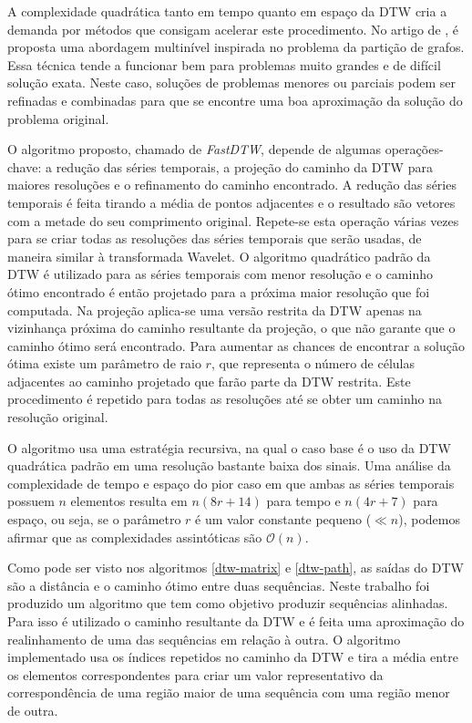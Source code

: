 A complexidade quadrática tanto em tempo quanto em espaço da DTW cria a demanda por métodos que consigam acelerar este procedimento. No artigo de \citet{salvador2007toward}, é proposta uma abordagem multinível inspirada no problema da partição de grafos. Essa técnica tende a funcionar bem para problemas muito grandes e de difícil solução exata. Neste caso, soluções de problemas menores ou parciais podem ser refinadas e combinadas para que se encontre uma boa aproximação da solução do problema original.

O algoritmo proposto, chamado de \textit{FastDTW}, depende de algumas operações-chave: a redução das séries temporais, a projeção do caminho da DTW para maiores resoluções e o refinamento do caminho encontrado. A redução das séries temporais é feita tirando a média de pontos adjacentes e o resultado são vetores com a metade do seu comprimento original. Repete-se esta operação várias vezes para se criar todas as resoluções das séries temporais que serão usadas, de maneira similar à transformada Wavelet. O algoritmo quadrático padrão da DTW é utilizado para as séries temporais com menor resolução e o caminho ótimo encontrado é então projetado para a próxima maior resolução que foi computada. Na projeção aplica-se uma versão restrita da DTW apenas na vizinhança próxima do caminho resultante da projeção, o que não garante que o caminho ótimo será encontrado. Para aumentar as chances de encontrar a solução ótima existe um parâmetro de raio $r$, que representa o número de células adjacentes ao caminho projetado que farão parte da DTW restrita. Este procedimento é repetido para todas as resoluções até se obter um caminho na resolução original.

O algoritmo usa uma estratégia recursiva, na qual o caso base é o uso da DTW quadrática padrão em uma resolução bastante baixa dos sinais. Uma análise da complexidade de tempo e espaço do pior caso em que ambas as séries temporais possuem $n$ elementos resulta em $n(8r + 14)$ para tempo e $n(4r + 7)$ para espaço, ou seja, se o parâmetro $r$ é um valor constante pequeno ($\ll n$), podemos afirmar que as complexidades assintóticas são $\mathcal{O}(n)$.

Como pode ser visto nos algoritmos \ref{dtw-matrix} e \ref{dtw-path}, as saídas do DTW são a distância e o caminho ótimo entre duas sequências. Neste trabalho foi produzido um algoritmo que tem como objetivo produzir sequências alinhadas. Para isso é utilizado o caminho resultante da DTW e é feita uma aproximação do realinhamento de uma das sequências em relação à outra. O algoritmo implementado usa os índices repetidos no caminho da DTW e tira a média entre os elementos correspondentes para criar um valor representativo da correspondência de uma região maior de uma sequência com uma região menor de outra.

